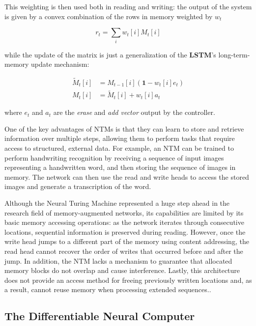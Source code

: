 \documentclass{article}
\begin{document}
This weighting is then used both in reading and writing: the output of the system is given by a convex combination of the rows in memory weighted by $w_t$

\begin{equation}
    r_t = \sum_i w_t[i]M_t[i]
\end{equation}

while the update of the matrix is just a generalization of the \textbf{LSTM}'s long-term-memory update mechanism:

\begin{align}
    \tilde{M}_t[i] &= M_{t-1}[i](\mathbf{1}-w_t[i] e_t)\\
    M_t[i] &= \tilde{M}_t[i] + w_t[i] a_t
\end{align}

where $e_t$ and $a_t$ are the \textit{erase} and \textit{add vector} output by the controller.

One of the key advantages of NTMs is that they can learn to store and retrieve information over multiple steps, allowing them to perform tasks that require access to structured, external data. For example, an NTM can be trained to perform handwriting recognition by receiving a sequence of input images representing a handwritten word, and then storing the sequence of images in memory. The network can then use the read and write heads to access the stored images and generate a transcription of the word.

Although the Neural Turing Machine represented a huge step ahead in the research field of memory-augmented networks, its capabilities are limited by its basic memory accessing operations: as the network iterates through consecutive locations, sequential information is preserved during reading. However, once the write head jumps to a different part of the memory using content addressing, the read head cannot recover the order of writes that occurred before and after the jump. In addition, the NTM lacks a mechanism to guarantee that allocated memory blocks do not overlap and cause interference. Lastly, this architecture does not provide an access method for freeing previously written locations and, as a result, cannot reuse memory when processing extended sequences..

\subsection{The Differentiable Neural Computer}
\end{document}
